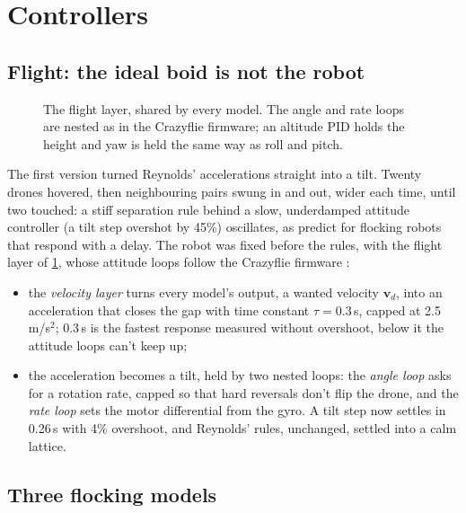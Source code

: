 \section{Controllers}
\label{sec:controllers}

\subsection{Flight: the ideal boid is not the robot}
\label{sec:flight}

\begin{figure}[!h]
  \centering
  
  \caption{The flight layer, shared by every model. The angle and rate loops
    are nested as in the Crazyflie firmware; an altitude PID holds the
    height and yaw is held the same way as roll and pitch.}
  \label{fig:flight}
\end{figure}

The first version turned Reynolds' accelerations straight into a tilt.
Twenty drones hovered, then neighbouring pairs swung in and out, wider each
time, until two touched: a stiff separation rule behind a slow, underdamped
attitude controller (a tilt step overshot by 45\%) oscillates, as
\citet{viragh2014} predict for flocking robots that respond with a delay. The robot was fixed before the rules, with the flight layer of
\cref{fig:flight}, whose attitude loops follow the Crazyflie firmware
\citep{bitcraze2024}:
\begin{itemize}
  \item the \emph{velocity layer} turns every model's output, a wanted
        velocity $\mathbf v_d$, into an acceleration that closes the gap
        with time constant $\tau = 0.3$\,s, capped at 2.5\,m/s$^2$; 0.3\,s is
        the fastest response measured without overshoot, below it the
        attitude loops can't keep up;
  \item the acceleration becomes a tilt, held by two nested loops: the
        \emph{angle loop} asks for a rotation rate, capped so that hard
        reversals don't flip the drone, and the \emph{rate loop} sets the
        motor differential from the gyro. A tilt step now settles in 0.26\,s
        with 4\% overshoot, and Reynolds' rules, unchanged, settled into a
        calm lattice.
\end{itemize}

\subsection{Three flocking models}
\label{sec:models}

